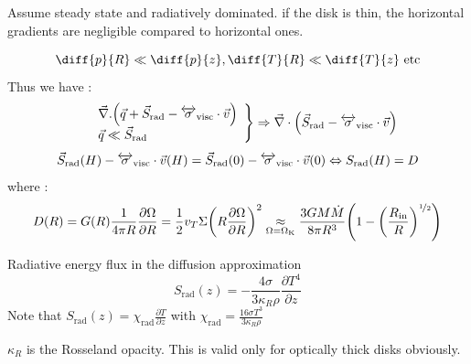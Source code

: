 \documentclass[10pt,a4paper,english]{article}
\let\originalleft\left
\let\originalright\right
\renewcommand{\left}{\mathopen{}\mathclose\bgroup\originalleft}
\renewcommand{\right}{\aftergroup\egroup\originalright}
\begin{document}
Assume steady state and radiatively dominated. if the disk is thin, the horizontal gradients
are negligible compared to horizontal ones.

\begin{equation}
    \diff{p}{R} \ll \diff{p}{z}, \diff{T}{R} \ll \diff{T}{z}\text{  etc}
\end{equation}
Thus we have :
\begin{equation}
    \left.
    \begin{array}{ll}
        & \vec{\nabla}.\left( \vec{q}+\vec{S}_\mathrm{rad}-\tens{\sigma}_\mathrm{visc}\cdot\vec{v}\right)\\
        & \vec{q} \ll \vec{S}_\mathrm{rad}
    \end{array}
\right \}\Rightarrow \vec{\nabla}\cdot\left(\vec{S}_\mathrm{rad}-\tens{\sigma}_\mathrm{visc}\cdot\vec{v}\right)
\end{equation}
\begin{equation}
    \vec{S}_\mathrm{rad}(H) - \overleftrightarrow{\sigma}_\mathrm{visc}\cdot\vec{v}(H) = \vec{S}_\mathrm{rad}(0) - \overleftrightarrow{\sigma}_\mathrm{visc}\cdot\vec{v}(0) \Leftrightarrow
    S_\mathrm{rad}(H) = D
\end{equation}
where :
\begin{equation}
    D(R) = G(R)\frac{1}{4\pi R}\frac{\partial \Omega}{\partial R } =
    \frac{1}{2}v_T \Sigma\left(   R\frac{\partial \Omega}{\partial R }\right)^2 \underset{\mathrm{\Omega = \Omega_K}}{\approx}
    \frac{3GM\dot{M}}{8\pi R^3}\left( 1-\left(\frac{R_\mathrm{in}}{R}\right)^{\nicefrac{1}{2}}\right)
\end{equation}

Radiative energy flux in the diffusion approximation
\begin{equation}
    S_\mathrm{rad}(z) = -\frac{4\sigma}{3\kappa_R \rho}\frac{\partial T^4}{\partial	z}
\end{equation}
Note that $\displaystyle S_\mathrm{rad}(z) = \chi_\mathrm{rad} \frac{\partial T }{\partial z } $ with $\displaystyle\chi_\mathrm{rad} = \frac{16 \sigma T^3}{3\kappa_R \rho}$

$\kappa_R$ is the Rosseland opacity. This is valid only for optically thick disks obviously.
\end{document}
